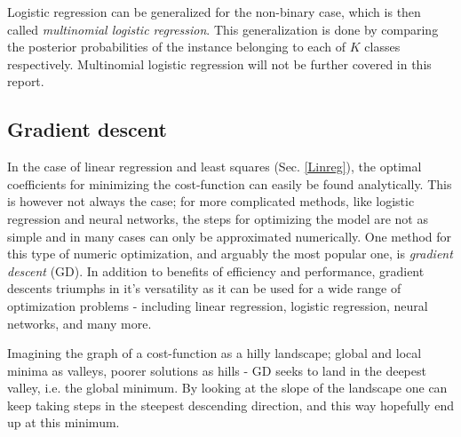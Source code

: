 Logistic regression can be generalized for the non-binary case, which is then called \textit{multinomial logistic regression}. This generalization is done by comparing the posterior probabilities of the instance belonging to each of $K$ classes respectively. Multinomial logistic regression will not be further covered in this report. 



\subsection{Gradient descent}
In the case of linear regression and least squares (Sec. \ref{Linreg}), the optimal coefficients for minimizing the cost-function can easily be found analytically. This is however not always the case; for more complicated methods, like logistic regression and neural networks, the steps for optimizing the model are not as simple and in many cases can only be approximated numerically.  
One method for this type of numeric optimization, and arguably the most popular one, is \textit{gradient descent} (GD). In addition to benefits of efficiency and performance, gradient descents triumphs in it's versatility as it can be used for a wide range of optimization problems - including linear regression, logistic regression, neural networks, and many more. 


Imagining the graph of a cost-function as a hilly landscape; global and local minima as valleys, poorer solutions as hills - GD seeks to land in the deepest valley, i.e. the global minimum. 
By looking at the slope of the landscape one can keep taking steps in the steepest descending direction, and this way hopefully end up at this minimum.

